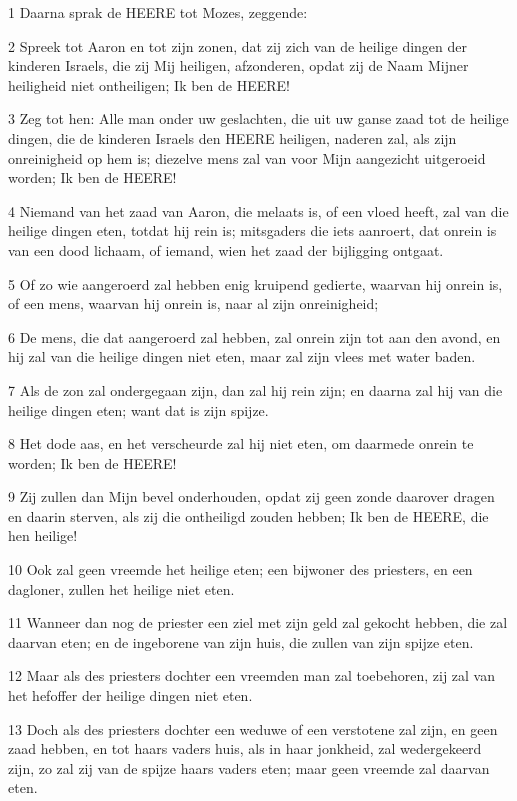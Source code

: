 \par 1 Daarna sprak de HEERE tot Mozes, zeggende:
\par 2 Spreek tot Aaron en tot zijn zonen, dat zij zich van de heilige dingen der kinderen Israels, die zij Mij heiligen, afzonderen, opdat zij de Naam Mijner heiligheid niet ontheiligen; Ik ben de HEERE!
\par 3 Zeg tot hen: Alle man onder uw geslachten, die uit uw ganse zaad tot de heilige dingen, die de kinderen Israels den HEERE heiligen, naderen zal, als zijn onreinigheid op hem is; diezelve mens zal van voor Mijn aangezicht uitgeroeid worden; Ik ben de HEERE!
\par 4 Niemand van het zaad van Aaron, die melaats is, of een vloed heeft, zal van die heilige dingen eten, totdat hij rein is; mitsgaders die iets aanroert, dat onrein is van een dood lichaam, of iemand, wien het zaad der bijligging ontgaat.
\par 5 Of zo wie aangeroerd zal hebben enig kruipend gedierte, waarvan hij onrein is, of een mens, waarvan hij onrein is, naar al zijn onreinigheid;
\par 6 De mens, die dat aangeroerd zal hebben, zal onrein zijn tot aan den avond, en hij zal van die heilige dingen niet eten, maar zal zijn vlees met water baden.
\par 7 Als de zon zal ondergegaan zijn, dan zal hij rein zijn; en daarna zal hij van die heilige dingen eten; want dat is zijn spijze.
\par 8 Het dode aas, en het verscheurde zal hij niet eten, om daarmede onrein te worden; Ik ben de HEERE!
\par 9 Zij zullen dan Mijn bevel onderhouden, opdat zij geen zonde daarover dragen en daarin sterven, als zij die ontheiligd zouden hebben; Ik ben de HEERE, die hen heilige!
\par 10 Ook zal geen vreemde het heilige eten; een bijwoner des priesters, en een dagloner, zullen het heilige niet eten.
\par 11 Wanneer dan nog de priester een ziel met zijn geld zal gekocht hebben, die zal daarvan eten; en de ingeborene van zijn huis, die zullen van zijn spijze eten.
\par 12 Maar als des priesters dochter een vreemden man zal toebehoren, zij zal van het hefoffer der heilige dingen niet eten.
\par 13 Doch als des priesters dochter een weduwe of een verstotene zal zijn, en geen zaad hebben, en tot haars vaders huis, als in haar jonkheid, zal wedergekeerd zijn, zo zal zij van de spijze haars vaders eten; maar geen vreemde zal daarvan eten.
